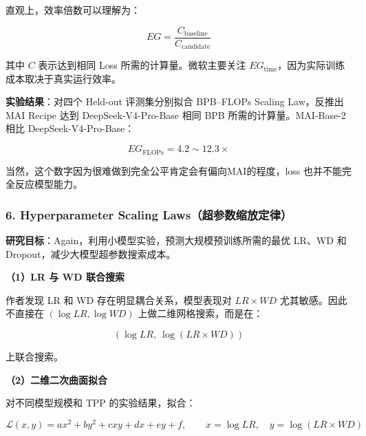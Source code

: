 \documentclass[
  11pt,
  a4paper,
  fontset=none]{ctexart}
\newenvironment{NotesFormula}{%
  \par\noindent\begin{minipage}{\linewidth}%
  \setlength{\parindent}{2em}%
  \setlength{\parskip}{0.35em}%
}{\end{minipage}\par}
\begin{document}
\begin{NotesFormula}

直观上，效率倍数可以理解为：

\[EG=\frac{C_{\mathrm{baseline}}}{C_{\mathrm{candidate}}}\]

\end{NotesFormula}

其中 \(C\) 表示达到相同 Loss 所需的计算量。微软主要关注
\(EG_{\mathrm{time}}\)，因为实际训练成本取决于真实运行效率。

\begin{NotesFormula}

\textbf{实验结果}：对四个 Held-out 评测集分别拟合 BPB--FLOPs Scaling
Law，反推出 MAI Recipe 达到 DeepSeek-V4-Pro-Base 相同 BPB
所需的计算量。MAI-Base-2 相比 DeepSeek-V4-Pro-Base：

\[\boxed{EG_{\mathrm{FLOPs}}=4.2\sim12.3\times}\]

\end{NotesFormula}

当然，这个数字因为很难做到完全公平肯定会有偏向MAI的程度，loss
也并不能完全反应模型能力。

\subsubsection{6. Hyperparameter Scaling
Laws（超参数缩放定律）}\label{hyperparameter-scaling-lawsux8d85ux53c2ux6570ux7f29ux653eux5b9aux5f8b}

\textbf{研究目标}：Again，利用小模型实验，预测大规模预训练所需的最优
LR、WD 和 Dropout，减少大模型超参数搜索成本。

\textbf{（1）LR 与 WD 联合搜索}

\begin{NotesFormula}

作者发现 LR 和 WD 存在明显耦合关系，模型表现对 \(LR\times WD\)
尤其敏感。因此不直接在 \((\log LR,\log WD)\) 上做二维网格搜索，而是在：

\[\boxed{(\log LR,\ \log(LR\times WD))}\]

\end{NotesFormula}

上联合搜索。

\textbf{（2）二维二次曲面拟合}

\begin{NotesFormula}

对不同模型规模和 TPP 的实验结果，拟合：

\[\mathcal L(x,y)=ax^2+by^2+cxy+dx+ey+f,\qquad
x=\log LR,\quad y=\log(LR\times WD)\]

\end{NotesFormula}
\end{document}
